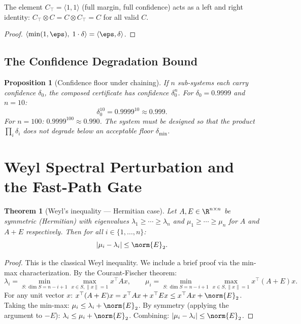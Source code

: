 \documentclass[11pt,letterpaper]{article}
\theoremstyle{pirtmthm}
\newtheorem{theorem}{Theorem}[section]
\newtheorem{proposition}{Proposition}[section]
\theoremstyle{remark}
\begin{document}
\begin{corollary}
The element $C_\top = \langle 1, 1 \rangle$ (full margin, full confidence)
acts as a left and right identity:
$C_\top \otimes C = C \otimes C_\top = C$ for all valid $C$.
\end{corollary}

\begin{proof}
$\langle\min(1,\eps),\; 1 \cdot \delta\rangle = \langle\eps,\delta\rangle$.
\end{proof}

\subsection{The Confidence Degradation Bound}

\begin{proposition}[Confidence floor under chaining]
\label{prop:conf-floor}
If $n$ sub-systems each carry confidence $\delta_0$, the composed
certificate has confidence $\delta_0^n$. For $\delta_0 = 0.9999$ and
$n = 10$:
\[
  \delta_0^{10} = 0.9999^{10} \approx 0.999.
\]
For $n = 100$: $0.9999^{100} \approx 0.990$.
The system must be designed so that the product $\prod_i \delta_i$
does not degrade below an acceptable floor $\delta_{\min}$.
\end{proposition}

\section{Weyl Spectral Perturbation and the Fast-Path Gate}
\label{sec:weyl}

\begin{theorem}[Weyl's inequality --- Hermitian case]
\label{thm:A-weyl-hermitian}
Let $A, E \in \R^{n \times n}$ be symmetric (Hermitian) with
eigenvalues $\lambda_1 \geq \cdots \geq \lambda_n$ and
$\mu_1 \geq \cdots \geq \mu_n$ for $A$ and $A + E$ respectively.
Then for all $i \in \{1,\ldots,n\}$:
\[
  |\mu_i - \lambda_i| \leq \norm{E}_2.
\]
\end{theorem}

\begin{proof}
This is the classical Weyl inequality. We include a brief proof via
the min-max characterization. By the Courant-Fischer theorem:
\[
  \lambda_i = \min_{S: \dim S = n-i+1} \max_{x \in S, \|x\|=1} x^\top A x,
  \qquad
  \mu_i = \min_{S: \dim S = n-i+1} \max_{x \in S, \|x\|=1} x^\top (A+E) x.
\]
For any unit vector $x$:
$x^\top(A+E)x = x^\top A x + x^\top E x \leq x^\top A x + \norm{E}_2$.
Taking the min-max:
$\mu_i \leq \lambda_i + \norm{E}_2$.
By symmetry (applying the argument to $-E$):
$\lambda_i \leq \mu_i + \norm{E}_2$.
Combining: $|\mu_i - \lambda_i| \leq \norm{E}_2$.
\end{proof}
\end{document}
